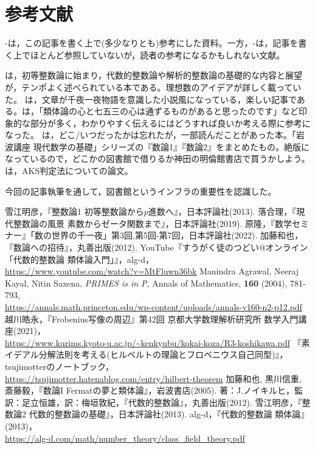 \section{参考文献}\label{bib}
\cite{yukie}-\cite{tsuji}は，この記事を書く上で(多少なりとも)参考にした資料。一方，\cite{suron}-\cite{alg}は，記事を書く上でほとんど参照していないが，読者の参考になるかもしれない文献。

\cite{modern_integers}は，初等整数論に始まり，代数的整数論や解析的整数論の基礎的な内容と展望が，テンポよく述べられている本である。理想数のアイデアが詳しく載っていた。
\cite{susemi}は，文章が千夜一夜物語を意識した小説風になっている，楽しい記事である。\cite{intro}は，「類体論の心と七五三の心は通ずるものがあると思ったのです」など印象的な部分が多く，わかりやすく伝えるにはどうすれば良いか考える際に参考になった。
\cite{suron}は，どこ/いつだったかは忘れたが，一部読んだことがあった本。「岩波講座 現代数学の基礎」シリーズの『数論1』『数論2』をまとめたもの。絶版になっているので，どこかの図書館で借りるか神田の明倫館書店で買うかしよう。\cite{primes_p}は，AKS判定法についての論文。

今回の記事執筆を通して，図書館というインフラの重要性を認識した。

\begin{thebibliography}{9}
     雪江明彦，『整数論1 初等整数論から$p$進数へ』，日本評論社(2013).
     落合理，『現代整数論の風景 素数からゼータ関数まで』，日本評論社(2019).
     原隆，『数学セミナー』「数の世界の千一夜」第3回,第5回-第7回，日本評論社(2022).
     加藤和也，『数論への招待』，丸善出版(2012).
     YouTube『すうがく徒のつどい@オンライン「代数的整数論 類体論入門」』，alg-d，\\
    \url{https://www.youtube.com/watch?v=MtFluwn36bk}
     Manindra Agrawal, Neeraj Kayal, Nitin Saxena, \emph{PRIMES is in P}, Annals of Mathematics, \textbf{160} (2004), 781-793,\\
    \url{https://annals.math.princeton.edu/wp-content/uploads/annals-v160-n2-p12.pdf}
     越川皓永，『Frobenius写像の周辺』第42回 京都大学数理解析研究所 数学入門講座(2021)，\\
    \url{https://www.kurims.kyoto-u.ac.jp/~kenkyubu/kokai-koza/R3-koshikawa.pdf}
     『素イデアル分解法則を考える(ヒルベルトの理論とフロベニウス自己同型)』，tsujimotterのノートブック，\\
    \url{https://tsujimotter.hatenablog.com/entry/hilbert-theorem}
     加藤和也, 黒川信重, 斎藤毅，『数論I Fermatの夢と類体論』，岩波書店(2005).
     著：J.ノイキルヒ，監訳：足立恒雄，訳：梅垣敦紀，『代数的整数論』，丸善出版(2012).
     雪江明彦，『整数論2 代数的整数論の基礎』，日本評論社(2013).
     alg-d，『代数的整数論 類体論』(2013)，\\
    \url{https://alg-d.com/math/number\_theory/class\_field\_theory.pdf}
\end{thebibliography}
